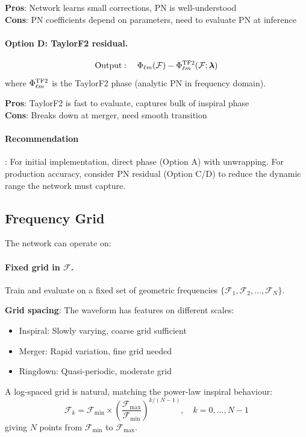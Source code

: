 \documentclass[11pt,a4paper]{article}
\newcommand{\Philm}{\Phi_{\ell m}}
\newcommand{\veclambda}{\bm{\lambda}}
\newcommand{\Mf}{\mathcal{F}}
\begin{document}
\textbf{Pros}: Network learns small corrections, PN is well-understood \\
\textbf{Cons}: PN coefficients depend on parameters, need to evaluate PN at inference

\paragraph{Option D: TaylorF2 residual.}
\begin{equation}
    \text{Output}: \quad \Philm(\Mf) - \Philm^{\rm TF2}(\Mf; \veclambda)
\end{equation}
where $\Philm^{\rm TF2}$ is the TaylorF2 phase (analytic PN in frequency domain).

\textbf{Pros}: TaylorF2 is fast to evaluate, captures bulk of inspiral phase \\
\textbf{Cons}: Breaks down at merger, need smooth transition

\paragraph{Recommendation}: For initial implementation, direct phase (Option A) with unwrapping. For production accuracy, consider PN residual (Option C/D) to reduce the dynamic range the network must capture.

\subsection{Frequency Grid}
\label{sec:frequency_grid}

The network can operate on:

\paragraph{Fixed grid in $\Mf$.}
Train and evaluate on a fixed set of geometric frequencies $\{\Mf_1, \Mf_2, \ldots, \Mf_N\}$.

\textbf{Grid spacing}: The waveform has features on different scales:
\begin{itemize}
    \item Inspiral: Slowly varying, coarse grid sufficient
    \item Merger: Rapid variation, fine grid needed
    \item Ringdown: Quasi-periodic, moderate grid
\end{itemize}

A log-spaced grid is natural, matching the power-law inspiral behaviour:
\begin{equation}
    \Mf_k = \Mf_{\min} \times \left( \frac{\Mf_{\max}}{\Mf_{\min}} \right)^{k/(N-1)}, \quad k = 0, \ldots, N-1
\end{equation}
giving $N$ points from $\Mf_{\min}$ to $\Mf_{\max}$.
\end{document}
